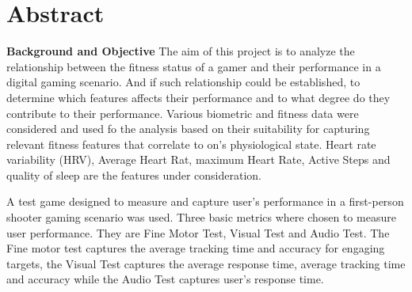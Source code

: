 \chapter{Abstract}
\textbf{Background and Objective} The aim of this project is to analyze the relationship between the fitness status of a gamer and their 
performance in a digital gaming scenario. And if such relationship could be established, to determine which features affects their performance and 
to what degree do they contribute to their performance. 
Various biometric and fitness data were considered and used fo the analysis based on their suitability for capturing relevant fitness features that 
correlate to on's physiological state. Heart rate variability (HRV), Average Heart Rat, maximum Heart Rate, Active Steps and quality of sleep are the 
features under consideration. 

A test game designed to measure and capture user's performance in a first-person shooter gaming scenario was used. Three basic metrics where chosen 
to measure user performance. They are Fine Motor Test, Visual Test and Audio Test. The Fine motor test captures the average tracking time and accuracy 
for engaging targets, the Visual Test captures the average response time, average tracking time and accuracy while the Audio Test captures user's 
response time. 
